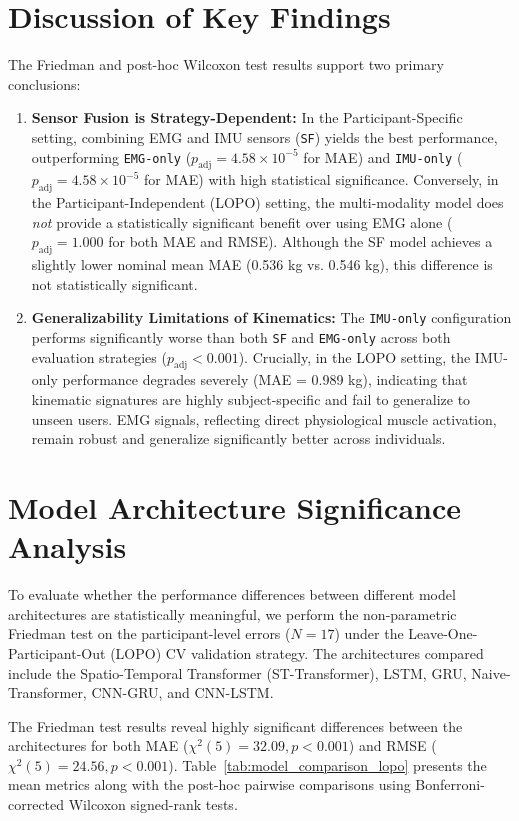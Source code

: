 \section{Discussion of Key Findings}
The Friedman and post-hoc Wilcoxon test results support two primary conclusions:
\begin{enumerate}
    \item \textbf{Sensor Fusion is Strategy-Dependent:} 
    In the Participant-Specific setting, combining EMG and IMU sensors (\texttt{SF}) yields the best performance, outperforming \texttt{EMG-only} ($p_{\text{adj}} = 4.58 \times 10^{-5}$ for MAE) and \texttt{IMU-only} ($p_{\text{adj}} = 4.58 \times 10^{-5}$ for MAE) with high statistical significance.
    Conversely, in the Participant-Independent (LOPO) setting, the multi-modality model does \textit{not} provide a statistically significant benefit over using EMG alone ($p_{\text{adj}} = 1.000$ for both MAE and RMSE). Although the SF model achieves a slightly lower nominal mean MAE (0.536 kg vs. 0.546 kg), this difference is not statistically significant.
    
    \item \textbf{Generalizability Limitations of Kinematics:}
    The \texttt{IMU-only} configuration performs significantly worse than both \texttt{SF} and \texttt{EMG-only} across both evaluation strategies ($p_{\text{adj}} < 0.001$). Crucially, in the LOPO setting, the IMU-only performance degrades severely (MAE = 0.989 kg), indicating that kinematic signatures are highly subject-specific and fail to generalize to unseen users. EMG signals, reflecting direct physiological muscle activation, remain robust and generalize significantly better across individuals.
\end{enumerate}

\section{Model Architecture Significance Analysis}
To evaluate whether the performance differences between different model architectures are statistically meaningful, we perform the non-parametric Friedman test on the participant-level errors ($N=17$) under the Leave-One-Participant-Out (LOPO) CV validation strategy. The architectures compared include the Spatio-Temporal Transformer (ST-Transformer), LSTM, GRU, Naive-Transformer, CNN-GRU, and CNN-LSTM.

The Friedman test results reveal highly significant differences between the architectures for both MAE ($\chi^2(5) = 32.09, p < 0.001$) and RMSE ($\chi^2(5) = 24.56, p < 0.001$). Table~\ref{tab:model_comparison_lopo} presents the mean metrics along with the post-hoc pairwise comparisons using Bonferroni-corrected Wilcoxon signed-rank tests.

